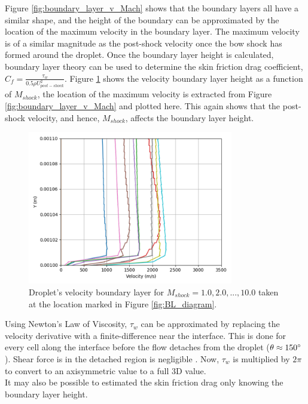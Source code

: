 \documentclass{UCF_ETD}
\begin{document}
Figure \ref{fig:boundary_layer_v_Mach} shows that the boundary layers all have a similar shape, and the height of the boundary can be approximated by the location of the maximum velocity in the boundary layer. The maximum velocity is of a similar magnitude as the post-shock velocity once the bow shock has formed around the droplet.
Once the boundary layer height is calculated, boundary layer theory can be used to determine the skin friction drag coefficient, $C_{f} = \frac{\tau_{w}}{0.5 \rho U^{2}_{post-shock}}$.
Figure \ref{fig:BL_heigh_v_mach} shows the velocity boundary layer height as a function of $M_{shock}$, the location of the maximum velocity is extracted from Figure \ref{fig:boundary_layer_v_Mach} and plotted here.
This again shows that the post-shock velocity, and hence, $M_{shock}$, affects the boundary layer height.

\begin{figure}
    \centering
    \includegraphics[width=0.8\textwidth]{Figures/coplotted_BLs.png}
    \caption{Droplet's velocity boundary layer for $M_{shock} = 1.0, 2.0,...,10.0$ taken at the location marked in Figure \ref{fig:BL_diagram}.}
    \label{fig:BL_heigh_v_mach}
\end{figure}

Using Newton's Law of Viscosity, $\tau_{w}$ can be approximated by replacing the velocity derivative with a finite-difference near the interface.
This is done for every cell along the interface before the flow detaches from the droplet ($\theta \approx 150\degree$). Shear force is in the detached region is negligible \cite{Khan2004}. 
Now, $\tau_{w}$ is multiplied by $2\pi$ to convert to an axisymmetric value to a full 3D value. \\
It may also be possible to estimated the skin friction drag only knowing the boundary layer height.
\end{document}
